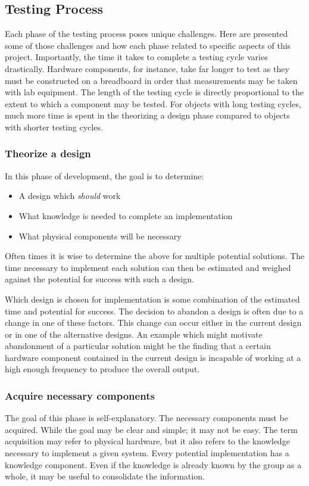 \documentclass{article}	%
\begin{document}
\begin{multicols}{2}
\subsection{Testing Process}
Each phase of the testing process poses unique challenges.
Here are presented some of those challenges and
how each phase related to specific aspects of this project.
Importantly, the time it takes to complete a 
testing cycle varies drastically.
Hardware components, for instance, take far longer to test
as they must be constructed on a breadboard in order that 
measurements may be taken with lab equipment.
%
The length of the testing cycle is 
directly proportional to the extent to
which a component may be tested.
%
For objects with long testing cycles,
much more time is spent in the 
theorizing a design phase compared to
objects with shorter testing cycles.

\subsubsection{Theorize a design}
In this phase of development,
the goal is to determine:
\begin{itemize}
\item A design which \emph{should} work
\item What knowledge is needed to complete an implementation
\item What physical components will be necessary
\end{itemize}

Often times it is wise to determine the above for
multiple potential solutions.
The time necessary to implement each solution
can then be estimated and weighed against
the potential for success with such a design.

Which design is chosen for implementation is
some combination of the estimated time and
potential for success.
The decision to abandon a design is often
due to a change in one of these factors.
This change can occur either
in the current design or
in one of the alternative designs.
An example which might motivate abandonment of a 
particular solution might be
the finding that a certain hardware component
contained in the current design is incapable of 
working at a high enough frequency to
produce the overall output.


\subsubsection{Acquire necessary components}
The goal of this phase is self-explanatory.
The necessary components must be acquired.
While the goal may be clear and simple;
it may not be easy.
The term acquisition may refer to  physical hardware,
but it also refers to the knowledge necessary to implement
a given system.
Every potential implementation has a knowledge component.
Even if the knowledge is already known by the group as a whole,
it may be useful to consolidate the information.


\end{multicols}
\end{document}
